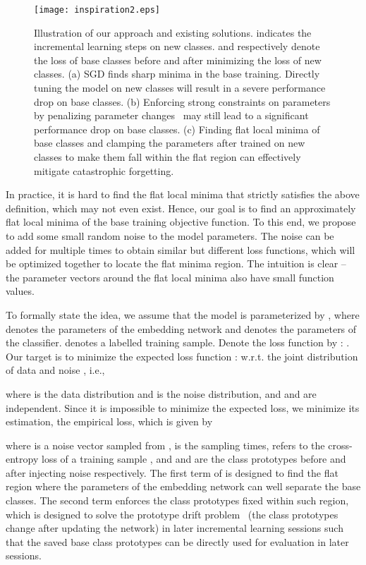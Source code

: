 \documentclass{article}
\begin{document}
\begin{figure}[t]
  \centering
    \texttt{[image: inspiration2.eps]} \label{fig_emb_tf}
  \caption{Illustration of our approach and existing solutions.  indicates the incremental learning steps on new classes.  and  respectively denote the loss of base classes before and after minimizing the loss of new classes. (a) SGD finds sharp minima in the base training. Directly tuning the model on new classes will result in a severe performance drop on base classes. (b) Enforcing strong constraints on parameters by penalizing parameter changes~\citep{aljundi2018memory,kirkpatrick2017overcoming,FSLL} may still lead to a significant performance drop on base classes. (c) Finding flat local minima of base classes and clamping the parameters after trained on new classes to make them fall within the flat region can effectively mitigate catastrophic forgetting.
  }
  \label{fig_illustration}
\end{figure}

In practice, it is hard to find the flat local minima that strictly satisfies the above definition, which may not even exist. Hence, our goal is to find an approximately flat local minima of the base training objective function. To this end, we propose to add some small random noise to the model parameters. The noise can be added for multiple times to obtain similar but different loss functions, which will be optimized together to locate the flat minima region. The intuition is clear -- the parameter vectors around the flat local minima also have small function values. 

To formally state the idea, we assume that the model is parameterized by , where  denotes the parameters of the embedding network and  denotes the parameters of the classifier.  denotes a labelled training sample. 
Denote the loss function by : . 
Our target is to minimize the expected loss function :  w.r.t. the joint distribution of data  and noise , i.e.,

where  is the data distribution and  is the noise distribution, and  and  are independent.
Since it is impossible to minimize the expected loss, we minimize its estimation, the empirical loss, which is given by



where  is a noise vector sampled from ,  is the sampling times,  refers to the cross-entropy loss of a training sample , and  and  are the class prototypes before and after injecting noise respectively. The first term of  is designed to find the flat region where the parameters  of the embedding network can well separate the base classes. The second term enforces the class prototypes fixed within such region, which is designed to solve the prototype drift problem~\citep{Yu2020SemanticDC, IDLVQC} (the class prototypes change after updating the network) in later incremental learning sessions such that the saved base class prototypes can be directly used for evaluation in later sessions.
\end{document}
